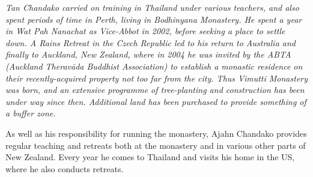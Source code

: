 \emph{Tan Chandako carried on training in Thailand under various
teachers, and also spent periods of time in Perth, living in Bodhinyana
Monastery. He spent a year in Wat Pah Nanachat as Vice-Abbot in 2002,
before seeking a place to settle down. A Rains Retreat in the Czech
Republic led to his return to Australia and finally to Auckland, New
Zealand, where in 2004 he was invited by the ABTA (Auckland Theravāda 
Buddhist Association) to establish a monastic residence on their
recently-acquired property not too far from the city. Thus Vimutti
Monastery was born, and an extensive programme of tree-planting and
construction has been under way since then. Additional land has been
purchased to provide something of a buffer zone.}

As well as his responsibility for running the monastery, Ajahn Chandako
provides regular teaching and retreats both at the monastery and in
various other parts of New Zealand. Every year he comes to Thailand and
visits his home in the US, where he also conducts retreats.

